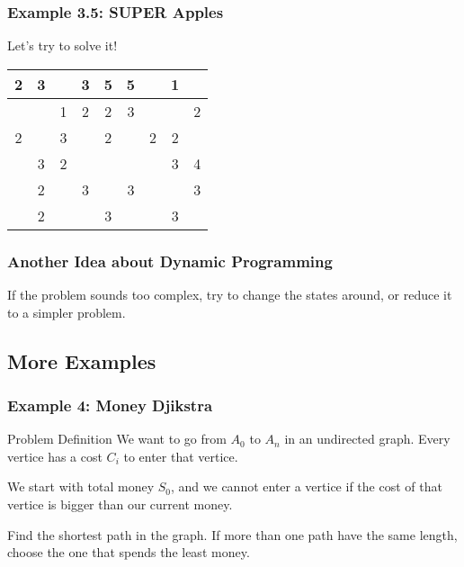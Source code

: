\documentclass{beamer}
\begin{document}
\begin{frame}
  \frametitle{Example 3.5: SUPER Apples}
  \begin{block}{}
    Let's try to solve it!
  \end{block}
  \begin{center}
    \begin{tabular}{|c|c|c|c|c|c|c|c|c|}
      \hline
      2 & 3 & & 3 & 5 & 5 & & 1 & \\
      \hline
      & & 1 & 2 & 2 & 3 & & & 2 \\
      \hline
    2 & & 3 & & 2 & & 2 & 2 & \\
    \hline
    & 3 & 2 & & & & & 3 & 4 \\
    \hline
    & 2 & & 3 & & 3 & & & 3\\
    \hline
    & 2 & & & 3 & & & 3 & \\
    \hline      
    \end{tabular}
  \end{center}
\end{frame}

\begin{frame}
  \frametitle{Another Idea about Dynamic Programming}
  \begin{block}{}
    If the problem sounds too complex, try to change the states
    around, or reduce it to a simpler problem.
  \end{block}
\end{frame}

\subsection{More Examples}

\begin{frame}
  \frametitle{Example 4: Money Djikstra}
  \begin{block}{Problem Definition}
    We want to go from $A_0$ to $A_n$ in an undirected graph. Every
    vertice has a cost $C_i$ to enter that vertice.\\
    \medskip

    We start with total money $S_0$, and we cannot enter a vertice if
    the cost of that vertice is bigger than our current money.\\
    \medskip

    Find the shortest path in the graph. If more than one path have
    the same length, choose the one that spends the least money.
  \end{block}
\end{frame}
\end{document}
